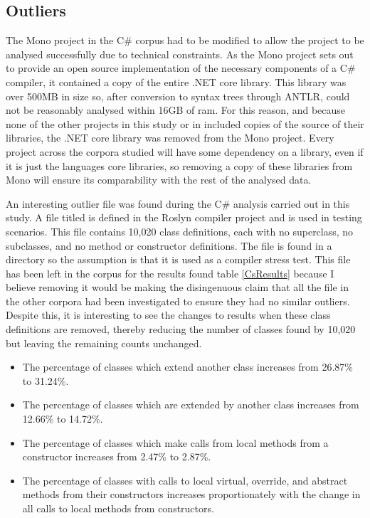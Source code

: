 \subsection{Outliers}
The Mono project in the C\# corpus had to be modified to allow the project to be analysed successfully due to technical constraints. As the Mono project sets out to provide an open source implementation of the necessary components of a C\# compiler, it contained a copy of the entire .NET core library. This library was over 500MB in size so, after conversion to syntax trees through ANTLR, could not be reasonably analysed within 16GB of ram. For this reason, and because none of the other projects in this study or in \cite{QualitasCorpus} included copies of the source of their libraries, the .NET core library was removed from the Mono project. Every project across the corpora studied will have some dependency on a library, even if it is just the languages core libraries, so removing a copy of these libraries from Mono will ensure its comparability with the rest of the analysed data.
\newline

An interesting outlier file was found during the C\# analysis carried out in this study. A file titled  is defined in the Roslyn compiler project and is used in testing scenarios. This file contains 10,020 class definitions, each with no superclass, no subclasses, and no method or constructor definitions. The file is found in a  directory so the assumption is that it is used as a compiler stress test. This file has been left in the corpus for the results found table \ref{CsResults} because I believe removing it would be making the disingenuous claim that all the file in the other corpora had been investigated to ensure they had no similar outliers. Despite this, it is interesting to see the changes to results when these class definitions are removed, thereby reducing the number of classes found by 10,020 but leaving the remaining counts unchanged.
\begin{itemize}
	\item The percentage of classes which extend another class increases from 26.87\% to 31.24\%.
	\item The percentage of classes which are extended by another class increases from 12.66\% to 14.72\%.
	\item The percentage of classes which make calls from local methods from a constructor increases from 2.47\% to 2.87\%.
	\item The percentage of classes with calls to local virtual, override, and abstract methods from their constructors increases proportionately with the change in all calls to local methods from constructors.
\end{itemize}

